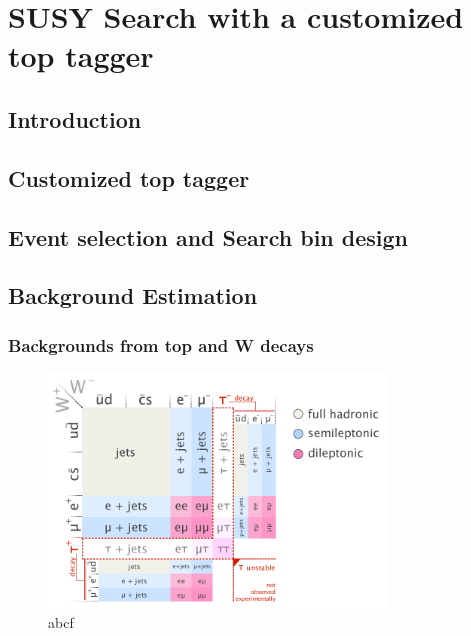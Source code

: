 \chapter{SUSY Search with a customized top tagger}

\clearpage
\section{Introduction}
\label{sec:c4intro}


\clearpage
\section{Customized top tagger}

\clearpage
\section{Event selection and Search bin design}

\clearpage
\section{Background Estimation}

\clearpage
\subsection{Backgrounds from top and W decays}
\begin{figure}[htbp]
 \begin{center}
  \includegraphics[width=0.8\textwidth]{figures/c4/c4_top_w_decaymod.png}
 \end{center}
 \caption{abcf}
 \label{fig:c4twdecaymod}
\end{figure}

